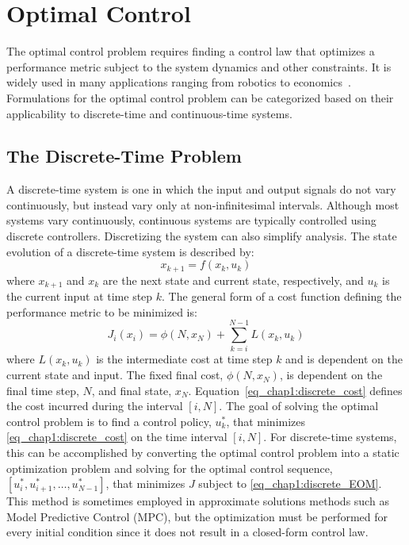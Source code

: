 \section{Optimal Control}
\label{sec:optimal_control_overview}
The optimal control problem requires finding a control law that optimizes a performance metric subject to the system dynamics and other constraints. It is widely used in many applications ranging from robotics to economics~\cite{Lewis:2012a}.
%
Formulations for the optimal control problem can be categorized based on their applicability to discrete-time and continuous-time systems.

\subsection{The Discrete-Time Problem}
A discrete-time system is one in which the input and output signals do not vary continuously, but instead vary only at non-infinitesimal intervals. Although most systems vary continuously, continuous systems are typically controlled using discrete controllers. Discretizing the system can also simplify analysis. The state evolution of a discrete-time system is described by:
%
\begin{equation}
x_{k+1}=f(x_k,u_k)
\label{eq_chap1:discrete_EOM}
\end{equation}
%
where $x_{k+1}$ and $x_k$ are the next state and current state, respectively, and $u_k$ is the current input at time step $k$. The general form of a cost function defining the performance metric to be minimized is:
%
\begin{equation}
J_i(x_i)=\phi(N,x_N)+\sum_{k=i}^{N-1}L(x_k,u_k)
\label{eq_chap1:discrete_cost}
\end{equation}
%
where $L(x_k,u_k)$ is the intermediate cost at time step $k$ and is dependent on the current state and input. The fixed final cost, $\phi(N,x_N)$, is dependent on the final time step, $N$, and final state, $x_N$. Equation~\eqref{eq_chap1:discrete_cost} defines the cost incurred during the interval $[i,N]$. The goal of solving the optimal control problem is to find a control policy, $u_k^*$, that minimizes \eqref{eq_chap1:discrete_cost} on the time interval $[i,N]$. For discrete-time systems, this can be accomplished by converting the optimal control problem into a static optimization problem and solving for the optimal control sequence, $[u_i^*, u_{i+1}^*, \dots, u_{N-1}^*]$, that minimizes $J$ subject to \eqref{eq_chap1:discrete_EOM}. This method is sometimes employed in approximate solutions methods such as Model Predictive Control (MPC), but the optimization must be performed for every initial condition since it does not result in a closed-form control law.

